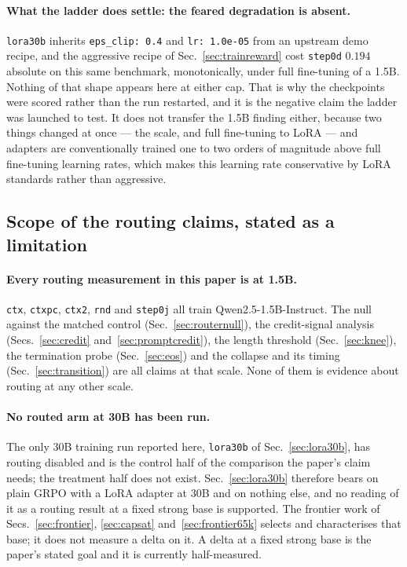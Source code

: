 \paragraph{What the ladder does settle: the feared degradation is absent.} \texttt{lora30b}
inherits \texttt{eps\_clip: 0.4} and \texttt{lr: 1.0e-05} from an upstream demo recipe, and
the aggressive recipe of Sec.~\ref{sec:trainreward} cost \texttt{step0d} $0.194$ absolute on
this same benchmark, monotonically, under full fine-tuning of a 1.5B. Nothing of that shape
appears here at either cap. That is why the checkpoints were scored rather than the run
restarted, and it is the negative claim the ladder was launched to test. It does not transfer
the 1.5B finding either, because two things changed at once --- the scale, and full
fine-tuning to LoRA --- and adapters are conventionally trained one to two orders of
magnitude above full fine-tuning learning rates, which makes this learning rate conservative
by LoRA standards rather than aggressive.

\subsection{Scope of the routing claims, stated as a limitation}
\label{sec:routingscope}

\paragraph{Every routing measurement in this paper is at 1.5B.} \texttt{ctx}, \texttt{ctxpc},
\texttt{ctx2}, \texttt{rnd} and \texttt{step0j} all train Qwen2.5-1.5B-Instruct. The null
against the matched control (Sec.~\ref{sec:routernull}), the credit-signal analysis
(Secs.~\ref{sec:credit} and~\ref{sec:promptcredit}), the length threshold
(Sec.~\ref{sec:knee}), the termination probe (Sec.~\ref{sec:eos}) and the collapse and its
timing (Sec.~\ref{sec:transition}) are all claims at that scale. None of them is evidence
about routing at any other scale.

\paragraph{No routed arm at 30B has been run.} The only 30B training run reported here,
\texttt{lora30b} of Sec.~\ref{sec:lora30b}, has routing disabled and is the control half of
the comparison the paper's claim needs; the treatment half does not exist. Sec.~\ref{sec:lora30b}
therefore bears on plain GRPO with a LoRA adapter at 30B and on nothing else, and no reading
of it as a routing result at a fixed strong base is supported. The frontier work of
Secs.~\ref{sec:frontier}, \ref{sec:capsat} and~\ref{sec:frontier65k} selects and characterises
that base; it does not measure a delta on it. A delta at a fixed strong base is the paper's
stated goal and it is currently half-measured.

